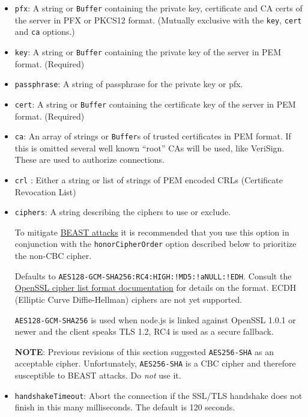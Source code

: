 \begin{itemize}
\item
  \texttt{pfx}: A string or \texttt{Buffer} containing the private key,
  certificate and CA certs of the server in PFX or PKCS12 format.
  (Mutually exclusive with the \texttt{key}, \texttt{cert} and
  \texttt{ca} options.)
\item
  \texttt{key}: A string or \texttt{Buffer} containing the private key
  of the server in PEM format. (Required)
\item
  \texttt{passphrase}: A string of passphrase for the private key or
  pfx.
\item
  \texttt{cert}: A string or \texttt{Buffer} containing the certificate
  key of the server in PEM format. (Required)
\item
  \texttt{ca}: An array of strings or \texttt{Buffer}s of trusted
  certificates in PEM format. If this is omitted several well known
  ``root'' CAs will be used, like VeriSign. These are used to authorize
  connections.
\item
  \texttt{crl} : Either a string or list of strings of PEM encoded CRLs
  (Certificate Revocation List)
\item
  \texttt{ciphers}: A string describing the ciphers to use or exclude.

  To mitigate
  \href{http://blog.ivanristic.com/2011/10/mitigating-the-beast-attack-on-tls.html}{BEAST
  attacks} it is recommended that you use this option in conjunction
  with the \texttt{honorCipherOrder} option described below to
  prioritize the non-CBC cipher.

  Defaults to \texttt{AES128-GCM-SHA256:RC4:HIGH:!MD5:!aNULL:!EDH}.
  Consult the
  \href{http://www.openssl.org/docs/apps/ciphers.html\#CIPHER\_LIST\_FORMAT}{OpenSSL
  cipher list format documentation} for details on the format. ECDH
  (Elliptic Curve Diffie-Hellman) ciphers are not yet supported.

  \texttt{AES128-GCM-SHA256} is used when node.js is linked against
  OpenSSL 1.0.1 or newer and the client speaks TLS 1.2, RC4 is used as a
  secure fallback.

  \textbf{NOTE}: Previous revisions of this section suggested
  \texttt{AES256-SHA} as an acceptable cipher. Unfortunately,
  \texttt{AES256-SHA} is a CBC cipher and therefore susceptible to BEAST
  attacks. Do \emph{not} use it.
\item
  \texttt{handshakeTimeout}: Abort the connection if the SSL/TLS
  handshake does not finish in this many milliseconds. The default is
  120 seconds.


\end{itemize}
